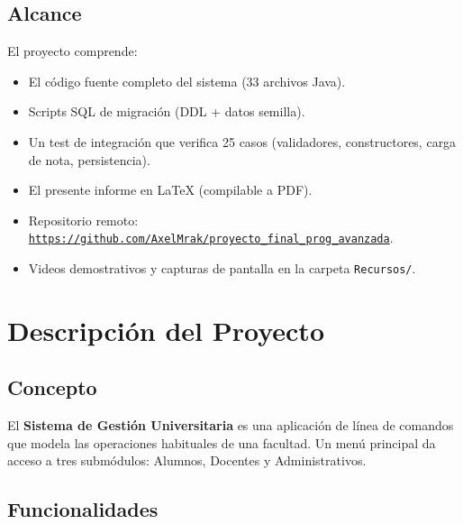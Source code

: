 \documentclass[12pt,a4paper]{article}
\newcommand{\repourl}{https://github.com/AxelMrak/proyecto\_final\_prog\_avanzada}
\begin{document}
\subsection{Alcance}

El proyecto comprende:
\begin{itemize}
    \item El código fuente completo del sistema (33 archivos Java).
    \item Scripts SQL de migración (DDL + datos semilla).
    \item Un test de integración que verifica 25 casos (validadores,
        constructores, carga de nota, persistencia).
    \item El presente informe en \LaTeX{} (compilable a PDF).
    \item Repositorio remoto: \href{\repourl}{\texttt{\repourl}}.
    \item Videos demostrativos y capturas de pantalla en la carpeta
        \texttt{Recursos/}.
\end{itemize}

\section{Descripción del Proyecto}

\subsection{Concepto}

El \textbf{Sistema de Gestión Universitaria} es una aplicación de línea de
comandos que modela las operaciones habituales de una facultad. Un menú
principal da acceso a tres submódulos: Alumnos, Docentes y
Administrativos.

\subsection{Funcionalidades}
\end{document}

